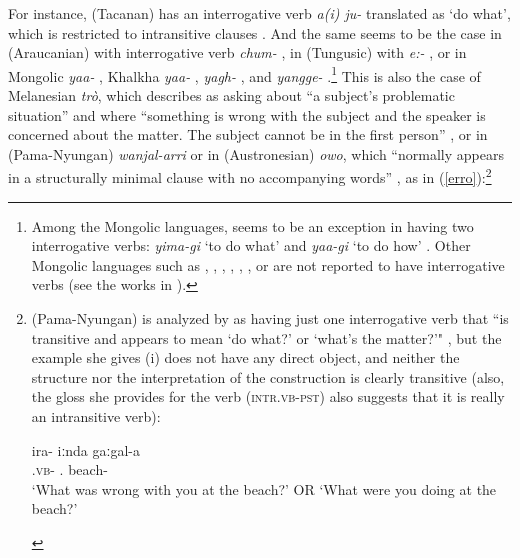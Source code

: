 \documentclass[output=paper]{langsci/langscibook}
\begin{document}
For instance,  (Tacanan) has an interrogative verb \emph{a(i) ju-}
translated as `do what', which is restricted to intransitive clauses
\citep{guillaume2008}. And the same seems to be the case in 
(Araucanian) with interrogative verb \emph{chum-}
\citep{deaugusta1903,smeets2007}, in  (Tungusic) with \emph{e:-}
\citep{Nedjalkov1997}, or in Mongolic  \emph{yaa-} \citep{skribnik2003},
Khalkha \emph{yaa-} \citep{svantesson2003},  \emph{yagh-}
\citep{blasing2003}, and  \emph{yangge-}
\citep{hugjiltu2003}.\footnote{Among the Mongolic languages,  seems
    to be an exception in having two interrogative verbs: \emph{yima-gi} `to do
    what' and \emph{yaa-gi} `to do how' \citep{nugteren2003}. Other Mongolic
    languages such as , , , , , , or
     are not reported to have interrogative verbs (see the works in
\citealt{janhunen2003}).} This is also the case of Melanesian 
\emph{tr\`o}, which \citet[229]{osumi1995} describes as asking about ``a
subject's problematic situation'' and where ``something is wrong with the
subject and the speaker is concerned about the matter.  The subject cannot be
in the first person'' \citep[233]{osumi1995}, or in  (Pama-Nyungan)
\emph{wanjal-arri} \citep{jones2011} or in  (Austronesian)
\emph{owo}, which ``normally appears in a structurally minimal clause with no
accompanying words'' \citep[238]{crowley1998}, as in
(\ref{erro}):\footnote{ (Pama-Nyungan) is analyzed by
    \citet{eades1979} as having just one interrogative verb that ``is
    transitive and appears to mean `do what?' or `what's the matter?'"
    \citep[302--303]{eades1979}, but the example she gives (i) does
    not have any direct object, and neither the structure nor the
    interpretation of the construction is clearly transitive (also, the gloss
    she provides for the verb (\textsc{intr.vb-pst}) also suggests that it is
    really an intransitive verb):

\begin{exe}
     \label{gumb} 
    \sn\gll \textbardotlessj ira-\ng{} {\ng iːnda} gaːgal-a\\
    \Intr.\textsc{vb}-\Pst{} \Ssg{}.\Aa{} beach-\Loc{}\\
\glt `What was wrong with you at the beach?' OR `What were you doing at the beach?'
\end{exe}
}
\end{document}
